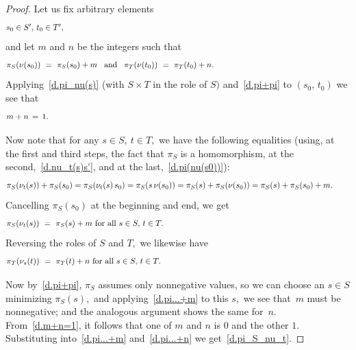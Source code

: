 \documentclass{amsart}
\numberwithin{equation}{section}
\numberwithin{theorem}{section}
\begin{document}
\begin{proof}
Let us fix arbitrary elements
%
\begin{equation}\begin{minipage}[c]{35pc}\label{d.s0t0}
$s_0\in S',$ $t_0\in T',$
\end{minipage}\end{equation}
%
and let $m$ and $n$ be the integers such that
%
\begin{equation}\begin{minipage}[c]{35pc}\label{d.pi(nu(s0))}
$\pi_S(\nu(s_0))~=~\pi_S(s_0)+m$\hspace{.5em} and\hspace{.5em}
$\pi_T(\nu(t_0))~=~\pi_T(t_0)+n.$
\end{minipage}\end{equation}
%
Applying~\eqref{d.pi_nu(s)} (with $S\times T$ in the role of $S)$
and~\eqref{d.pi+pi} to $(s_0,\,t_0)$ we see that
%
\begin{equation}\begin{minipage}[c]{35pc}\label{d.m+n=1}
$m + n\,=\,1.$
\end{minipage}\end{equation}

Now note that for any $s\in S,~t\in T,$ we have the following
equalities (using, at the first and third steps, the
fact that $\pi_S$ is a homomorphism, at the
second,~\eqref{d.nu_t(s)s'}, and at the last,~\eqref{d.pi(nu(s0))}):
%
\begin{equation}\begin{minipage}[c]{35pc}\label{d.pi_S...s0}
$\pi_S(\nu_t(s)) + \pi_S(s_0) = \pi_S(\nu_t(s)\,s_0) =
\pi_S(s\,\nu(s_0))
= \pi_S(s) + \pi_S(\nu(s_0)) = \pi_S(s) + \pi_S(s_0) + m.$
\end{minipage}\end{equation}
%
Cancelling $\pi_S(s_0)$ at the beginning and end, we get
%
\begin{equation}\begin{minipage}[c]{35pc}\label{d.pi...+m}
$\pi_S(\nu_t(s))~=~\pi_S(s) + m$ for all $s\in S,$ $t\in T.$
\end{minipage}\end{equation}
%
Reversing the roles of $S$ and $T,$ we likewise have
%
\begin{equation}\begin{minipage}[c]{35pc}\label{d.pi...+n}
$\pi_T(\nu_s(t))~=~\pi_T(t) + n$ for all $s\in S,$ $t\in T.$
\end{minipage}\end{equation}

Now by~\eqref{d.pi+pi}, $\pi_S$ assumes only nonnegative values,
so we can choose an $s\in S$ minimizing $\pi_S(s),$
and applying~\eqref{d.pi...+m} to this $s,$
we see that~$m$ must be nonnegative; and the
analogous argument shows the same for~$n.$
From~\eqref{d.m+n=1}, it follows that one of $m$
and $n$ is $0$ and the other $1.$
Substituting into~\eqref{d.pi...+m} and~\eqref{d.pi...+n}
we get~\eqref{d.pi_S_nu_t}.
\end{proof}
\end{document}
